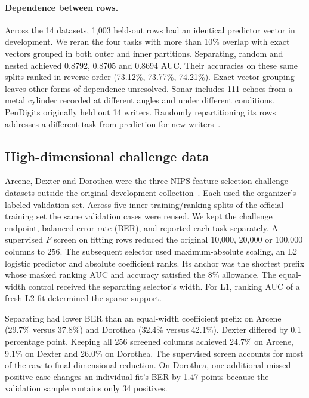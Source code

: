 \paragraph{Dependence between rows.}
Across the 14 datasets, 1,003 held-out rows had an identical predictor vector in development. We reran the four tasks with more than 10\% overlap with exact vectors grouped in both outer and inner partitions. Separating, random and nested achieved 0.8792, 0.8705 and 0.8694 AUC. Their accuracies on these same splits ranked in reverse order (73.12\%, 73.77\%, 74.21\%). Exact-vector grouping leaves other forms of dependence unresolved. Sonar includes 111 echoes from a metal cylinder recorded at different angles and under different conditions. PenDigits originally held out 14 writers. Randomly repartitioning its rows addresses a different task from prediction for new writers~\cite{sonardata,pendigitsdata}.

\subsection{High-dimensional challenge data}
Arcene, Dexter and Dorothea were the three NIPS feature-selection challenge datasets outside the original development collection~\cite{guyon2004challenge}. Each used the organizer's labeled validation set. Across five inner training/ranking splits of the official training set the same validation cases were reused. We kept the challenge endpoint, balanced error rate (BER), and reported each task separately. A supervised $F$ screen on fitting rows reduced the original 10,000, 20,000 or 100,000 columns to 256. The subsequent selector used maximum-absolute scaling, an L2 logistic predictor and absolute coefficient ranks. Its anchor was the shortest prefix whose masked ranking AUC and accuracy satisfied the 8\% allowance. The equal-width control received the separating selector's width. For L1, ranking AUC of a fresh L2 fit determined the sparse support.


Separating had lower BER than an equal-width coefficient prefix on Arcene (29.7\% versus 37.8\%) and Dorothea (32.4\% versus 42.1\%). Dexter differed by 0.1 percentage point. Keeping all 256 screened columns achieved 24.7\% on Arcene, 9.1\% on Dexter and 26.0\% on Dorothea. The supervised screen accounts for most of the raw-to-final dimensional reduction. On Dorothea, one additional missed positive case changes an individual fit's BER by 1.47 points because the validation sample contains only 34 positives.
